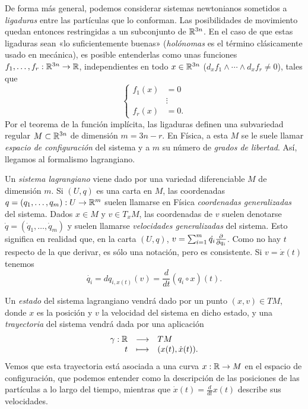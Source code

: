 De forma más general, podemos considerar sistemas newtonianos sometidos a \emph{ligaduras} entre las partículas que lo conforman. Las posibilidades de movimiento quedan entonces restringidas a un subconjunto de $\mathbb{R}^{3n}$. En el caso de que estas ligaduras sean «lo suficientemente buenas» (\emph{holónomas} es el término clásicamente usado en mecánica), es posible entenderlas como unas funciones $f_1,\dots,f_r: \mathbb{R}^{3n} \rightarrow \mathbb{R}$, independientes en todo $x \in \mathbb{R}^{3n}$ ($d_xf_1 \wedge \cdots \wedge d_xf_r \neq 0$), tales que
\begin{equation*}
  \left\lbrace
  \begin{array}{rl}
    f_1(x)&=0 \\
    &\vdots \\
    f_r(x)&=0.
  \end{array}
  \right.
\end{equation*}
Por el teorema de la función implícita, las ligaduras definen una subvariedad regular $M \subset \mathbb{R}^{3n}$ de dimensión $m=3n-r$. En Física, a esta $M$ se le suele llamar \emph{espacio de configuración} del sistema y a $m$ su número de \emph{grados de libertad}. Así, llegamos al formalismo lagrangiano. 

Un \emph{sistema lagrangiano} viene dado por una variedad diferenciable $M$ de dimensión $m$. Si $(U,q)$ es una carta en $M$, las coordenadas $q=(q_1,\dots,q_m): U \rightarrow \mathbb{R}^m$ suelen llamarse en Física \emph{coordenadas generalizadas} del sistema. Dados $x \in M$ y $v \in T_x M$, las coordenadas de $v$ suelen denotarse $\dot{q}=(\dot{q}_1,\dots,\dot{q}_m)$ y suelen llamarse \emph{velocidades generalizadas} del sistema. Esto significa en realidad que, en la carta $(U,q)$, $v=\sum_{i=1}^{m}\dot{q_i}\frac{\partial}{\partial q_i}$. Como no hay $t$ respecto de la que derivar, es sólo una notación, pero es consistente. Si $v=\dot{x}(t)$ tenemos
\begin{equation*}
  \dot{q_i} = dq_{i,x(t)}(v)=\frac{d}{dt}(q_i \circ x) (t).
\end{equation*}

Un \emph{estado} del sistema lagrangiano vendrá dado por un punto $(x,v) \in TM$, donde $x$ es la posición y $v$ la velocidad del sistema en dicho estado, y una \emph{trayectoria} del sistema vendrá dada por una aplicación
\begin{equation*}
  \begin{array}{rcl}
    \gamma: \mathbb{R} & \longrightarrow & TM \\
    t & \longmapsto & (x(t), \dot{x}(t)).
  \end{array}
\end{equation*}
Vemos que esta trayectoria está asociada a una curva $x:\mathbb{R} \rightarrow M$ en el espacio de configuración, que podemos entender como la descripción de las posiciones de las partículas a lo largo del tiempo, mientras que $\dot{x}(t)=\frac{d}{dt}x(t)$ describe sus velocidades.


